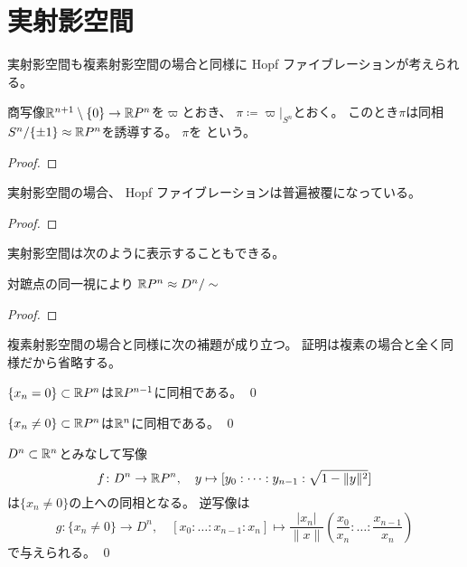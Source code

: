 \documentclass[report]{jlreq}
\begin{document}
\section{実射影空間}

実射影空間も複素射影空間の場合と同様に
Hopf ファイブレーションが考えられる。

\begin{theorem}
    商写像$\mathbb{R}^{n + 1} \setminus \{ 0 \} \to \mathbb{R} P^n$を$\varpi$とおき、
    $\pi \coloneqq \varpi|_{S^n}$とおく。
    このとき$\pi$は同相$S^n / \{ \pm 1 \} \approx \mathbb{R} P^n$を誘導する。
    $\pi$を  という。
\end{theorem}

\begin{proof}
    \TODO{}
\end{proof}

実射影空間の場合、
Hopf ファイブレーションは普遍被覆になっている。

\begin{proposition}[実射影空間の普遍被覆]
    \TODO{}
\end{proposition}

\begin{proof}
    \TODO{}
\end{proof}

実射影空間は次のように表示することもできる。

\begin{theorem}[実射影空間の表示]
    対蹠点の同一視により
    $\mathbb{R} P^n \approx D^n / \sim$
    \TODO{}
\end{theorem}

\begin{proof}
    \TODO{}
\end{proof}

複素射影空間の場合と同様に次の補題が成り立つ。
証明は複素の場合と全く同様だから省略する。

\begin{lemma}
    $\{ x_n = 0 \} \subset \mathbb{R} P^n$は$\mathbb{R} P^{n - 1}$に同相である。
    \qed
\end{lemma}

\begin{lemma}
    $\{ x_n \neq 0 \} \subset \mathbb{R} P^n$は$\mathbb{R}^n$に同相である。
    \qed
\end{lemma}

\begin{lemma}
    $D^{n} \subset \mathbb{R}^n$とみなして写像
    \begin{equation}
        f \colon D^{n} \to \mathbb{R} P^n,
            \quad
            y \mapsto [y_0 : \dots : y_{n - 1} : \sqrt{1 - \| y \|^2}]
    \end{equation}
    は$\{ x_n \neq 0 \}$の上への同相となる。
    逆写像は
    \begin{equation}
        g \colon \{ x_n \neq 0 \} \to D^{n},
            \quad
            [x_0 : \dots : x_{n - 1} : x_n]
                \mapsto \frac{|x_n|}{\| x \|} \left(
                    \frac{x_0}{x_n} : \dots : \frac{x_{n - 1}}{x_n}
                \right)
    \end{equation}
    で与えられる。
    \qed
\end{lemma}
\end{document}
